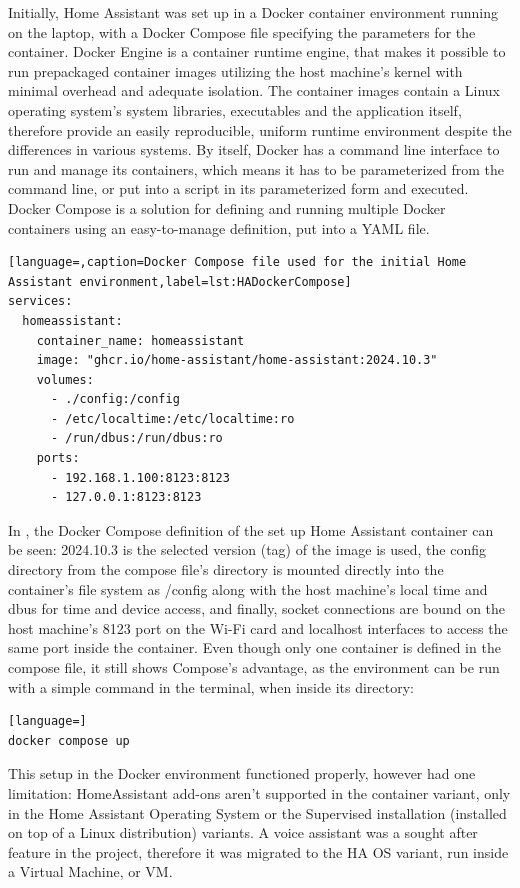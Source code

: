 Initially, Home Assistant was set up in a Docker container environment running on the laptop, with a Docker Compose file specifying the parameters for the container. Docker Engine is a container runtime engine, that makes it possible to run prepackaged container images utilizing the host machine's kernel with minimal overhead and adequate isolation. \cite{DockerContainer} The container images contain a Linux operating system's system libraries, executables and the application itself, therefore provide an easily reproducible, uniform runtime environment despite the differences in various systems. By itself, Docker has a command line interface to run and manage its containers, which means it has to be parameterized from the command line, or put into a script in its parameterized form and executed. Docker Compose is a solution for defining and running multiple Docker containers using an easy-to-manage definition, put into a YAML file. \cite{DockerCompose}

\begin{lstlisting}[language=,caption=Docker Compose file used for the initial Home Assistant environment,label=lst:HADockerCompose]
services:
  homeassistant:
    container_name: homeassistant
    image: "ghcr.io/home-assistant/home-assistant:2024.10.3"
    volumes:
      - ./config:/config
      - /etc/localtime:/etc/localtime:ro
      - /run/dbus:/run/dbus:ro
    ports:
      - 192.168.1.100:8123:8123
      - 127.0.0.1:8123:8123
\end{lstlisting}

In , the Docker Compose definition of the set up Home Assistant container can be seen: 2024.10.3 is the selected version (tag) of the image is used, the config directory from the compose file's directory is mounted directly into the container's file system as /config along with the host machine's local time and dbus for time and device access, and finally, socket connections are bound on the host machine's 8123 port on the Wi-Fi card and localhost interfaces to access the same port inside the container. Even though only one container is defined in the compose file, it still shows Compose's advantage, as the environment can be run with a simple command in the terminal, when inside its directory:

\begin{lstlisting}[language=]
docker compose up
\end{lstlisting}

This setup in the Docker environment functioned properly, however had one limitation: HomeAssistant add-ons aren't supported in the container variant, only in the Home Assistant Operating System or the Supervised installation (installed on top of a Linux distribution) variants. A voice assistant was a sought after feature in the project, therefore it was migrated to the HA OS variant, run inside a Virtual Machine, or VM.

